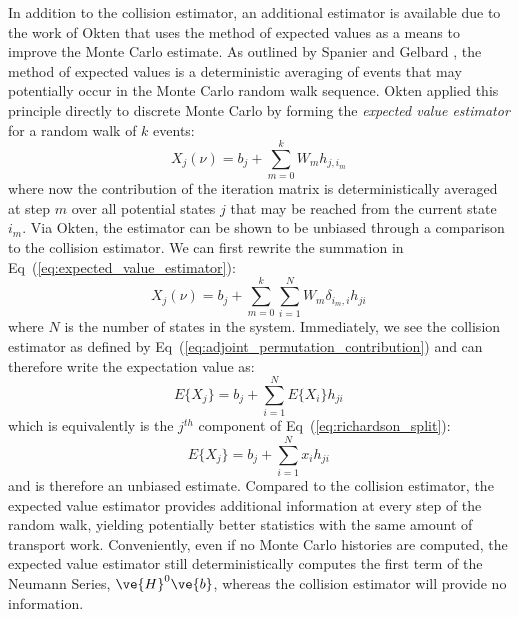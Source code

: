 \documentclass[letterpaper,11pt]{article}
\begin{document}
In addition to the collision estimator, an additional estimator is
available due to the work of Okten \cite{okten_solving_2005} that uses
the method of expected values as a means to improve the Monte Carlo
estimate. As outlined by Spanier and Gelbard
\cite{spanier_monte_1969}, the method of expected values is a
deterministic averaging of events that may potentially occur in the
Monte Carlo random walk sequence. Okten applied this principle
directly to discrete Monte Carlo by forming the \textit{expected value
  estimator} for a random walk of $k$ events:
\begin{equation}
  X_{j}(\nu) = b_j + \sum_{m=0}^k W_m h_{j,i_m}\,
  \label{eq:expected_value_estimator}
\end{equation}
where now the contribution of the iteration matrix is
deterministically averaged at step $m$ over all potential states $j$
that may be reached from the current state $i_m$. Via Okten, the
estimator can be shown to be unbiased through a comparison to the
collision estimator. We can first rewrite the summation in
Eq~(\ref{eq:expected_value_estimator}):
\begin{equation}
  X_{j}(\nu) = b_j + \sum_{m=0}^k \sum_{i=1}^N W_m
  \delta_{i_m,i} h_{ji}\,
  \label{eq:unbiased_eval_1}
\end{equation}
where $N$ is the number of states in the system. Immediately, we see
the collision estimator as defined by
Eq~(\ref{eq:adjoint_permutation_contribution}) and can therefore write
the expectation value as:
\begin{equation}
  E\{X_{j}\} = b_j + \sum_{i=1}^N E\{X_{i}\} h_{ji}\,
  \label{eq:unbiased_eval_2}
\end{equation}
which is equivalently is the $j^{th}$ component of
Eq~(\ref{eq:richardson_split}):
\begin{equation}
  E\{X_{j}\} = b_j + \sum_{i=1}^N x_{i} h_{ji}\,
  \label{eq:unbiased_eval_2}
\end{equation}
and is therefore an unbiased estimate. Compared to the collision
estimator, the expected value estimator provides additional
information at every step of the random walk, yielding potentially
better statistics with the same amount of transport
work. Conveniently, even if no Monte Carlo histories are computed, the
expected value estimator still deterministically computes the first
term of the Neumann Series, $\ve{H}^0\ve{b}$, whereas the collision
estimator will provide no information.
\end{document}
